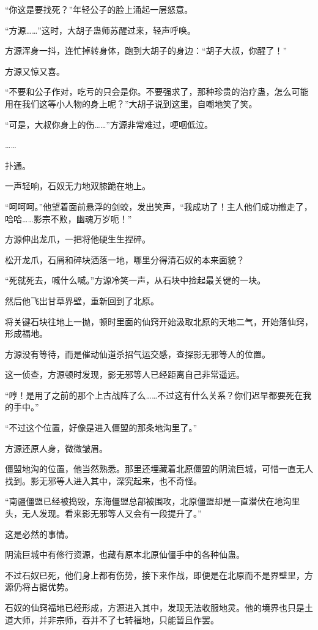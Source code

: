 \begin{this_body}
“你这是要找死？”年轻公子的脸上涌起一层怒意。

“方源……”这时，大胡子蛊师苏醒过来，轻声呼唤。

方源浑身一抖，连忙掉转身体，跑到大胡子的身边：“胡子大叔，你醒了！”

方源又惊又喜。

“不要和公子作对，吃亏的只会是你。不要强求了，那种珍贵的治疗蛊，怎么可能用在我们这等小人物的身上呢？”大胡子说到这里，自嘲地笑了笑。

“可是，大叔你身上的伤……”方源非常难过，哽咽低泣。

……

扑通。

一声轻响，石奴无力地双膝跪在地上。

“呵呵呵。”他望着面前悬浮的剑蛟，发出笑声，“我成功了！主人他们成功撤走了，哈哈……影宗不败，幽魂万岁呃！”

方源伸出龙爪，一把将他硬生生捏碎。

松开龙爪，石屑和碎块洒落一地，哪里分得清石奴的本来面貌？

“死就死去，喊什么喊。”方源冷笑一声，从石块中捡起最关键的一块。

然后他飞出甘草界壁，重新回到了北原。

将关键石块往地上一抛，顿时里面的仙窍开始汲取北原的天地二气，开始落仙窍，形成福地。

方源没有等待，而是催动仙道杀招气运交感，查探影无邪等人的位置。

这一侦查，方源顿时发现，影无邪等人已经距离自己非常遥远。

“哼！是用了之前的那个上古战阵了么……不过这有什么关系？你们迟早都要死在我的手中。”

“不过这个位置，好像是进入僵盟的那条地沟里了。”

方源还原人身，微微皱眉。

僵盟地沟的位置，他当然熟悉。那里还埋藏着北原僵盟的阴流巨城，可惜一直无人找到。影无邪等人进入其中，深究起来，也不奇怪。

“南疆僵盟已经被捣毁，东海僵盟总部被围攻，北原僵盟却是一直潜伏在地沟里头，无人发现。看来影无邪等人又会有一段提升了。”

这是必然的事情。

阴流巨城中有修行资源，也藏有原本北原仙僵手中的各种仙蛊。

不过石奴已死，他们身上都有伤势，接下来作战，即便是在北原而不是界壁里，方源仍将占据优势。

石奴的仙窍福地已经形成，方源进入其中，发现无法收服地灵。他的境界也只是土道大师，并非宗师，吞并不了七转福地，只能暂且作罢。


\end{this_body}
